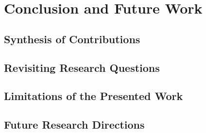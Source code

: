 \chapter{Conclusion and Future Work}
\label{chap:conclusion}

\section{Synthesis of Contributions}
\label{sec:conclusion_synthesis}


\section{Revisiting Research Questions}
\label{sec:conclusion_revisiting_rqs}


\section{Limitations of the Presented Work}
\label{sec:conclusion_limitations}


\section{Future Research Directions}
\label{sec:conclusion_future_work}

